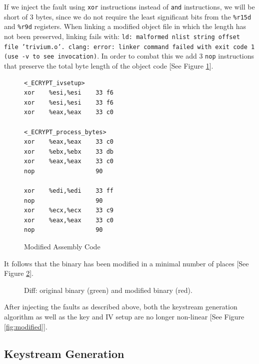 \documentclass[conference]{IEEEtran}
\newcommand{\code}[1]{\texttt{#1}}
\begin{document}
If we inject the fault using \code{xor} instructions instead of \code{and} instructions, we will be short of 3 bytes, since we do not require the least significant bits from the \code{\%r15d} and \code{\%r9d} registers. When linking a modified object file in which the length has not been preserved, linking fails with: \code{ld: malformed nlist string offset file 'trivium.o'. clang: error: linker command failed with exit code 1 (use -v to see invocation)}. In order to combat this we add 3 \code{nop} instructions that preserve the total byte length of the object code [See Figure \ref{fig:mod-asm}].

\begin{figure}[H]
\begin{lstlisting}[style=asm, frame=tlrb]
<_ECRYPT_ivsetup>
xor    %esi,%esi    33 f6
xor    %esi,%esi    33 f6
xor    %eax,%eax    33 c0

<_ECRYPT_process_bytes>
xor    %eax,%eax    33 c0
xor    %ebx,%ebx    33 db 
xor    %eax,%eax    33 c0
nop                 90

xor    %edi,%edi    33 ff
nop                 90
xor    %ecx,%ecx    33 c9
xor    %eax,%eax    33 c0
nop                 90
\end{lstlisting}
\caption{Modified Assembly Code}\label{fig:mod-asm}
\end{figure}

It follows that the binary has been modified in a minimal number of places [See Figure \ref{fig:diff}].

\begin{figure}[H]
\centering
{}
\caption{Diff: original binary (green) and modified binary (red).}
\label{fig:diff}
\end{figure}

After injecting the faults as described above, both the keystream generation algorithm as well as the key and IV setup are no longer non-linear [See Figure \ref{fig:modified}]. 

\subsection{Keystream Generation}
\end{document}
